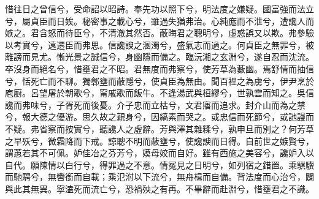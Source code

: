
\begin{pinyinscope}
惜往日之曾信兮，受命詔以昭詩。奉先功以照下兮，明法度之嫌疑。國富強而法立兮，屬貞臣而日娭。秘密事之載心兮，雖過失猶弗治。心純庬而不泄兮，遭讒人而嫉之。君含怒而待臣兮，不清澈其然否。蔽晦君之聰明兮，虛惑誤又以欺。弗參驗以考實兮，遠遷臣而弗思。信讒諛之溷濁兮，盛氣志而過之。何貞臣之無罪兮，被離謗而見尤。慚光景之誠信兮，身幽隱而備之。臨沅湘之玄淵兮，遂自忍而沈流。卒沒身而絕名兮，惜壅君之不昭。君無度而弗察兮，使芳草為藪幽。焉舒情而抽信兮，恬死亡而不聊。獨鄣壅而蔽隱兮，使貞臣為無由。聞百裡之為虜兮，伊尹烹於庖廚。呂望屠於朝歌兮，甯戚歌而飯牛。不逢湯武與桓繆兮，世孰雲而知之。吳信讒而弗味兮，子胥死而後憂。介子忠而立枯兮，文君寤而追求。封介山而為之禁兮，報大德之優游。思久故之親身兮，因縞素而哭之。或忠信而死節兮，或訑謾而不疑。弗省察而按實兮，聽讒人之虛辭。芳與澤其雜糅兮，孰申旦而別之？何芳草之早殀兮，微霜降而下戒。諒聰不明而蔽壅兮，使讒諛而日得。自前世之嫉賢兮，謂蕙若其不可佩。妒佳冶之芬芳兮，嫫母姣而自好。雖有西施之美容兮，讒妒入以自代。願陳情以白行兮，得罪過之不意。情冤見之日明兮，如列宿之錯置。乘騏驥而馳騁兮，無轡銜而自載；乘氾泭以下流兮，無舟楫而自備。背法度而心治兮，闢與此其無異。寧溘死而流亡兮，恐禍殃之有再。不畢辭而赴淵兮，惜壅君之不識。


\end{pinyinscope}